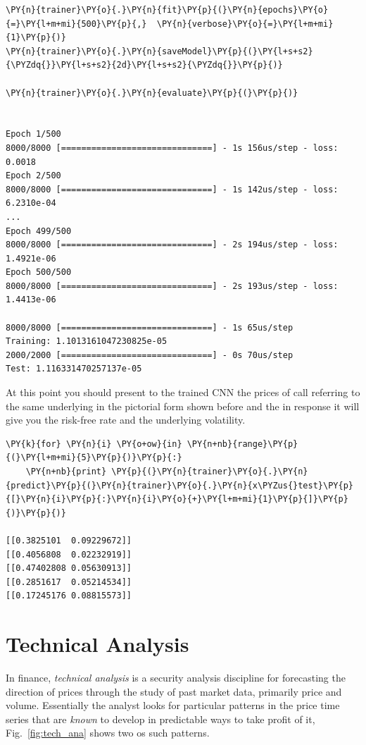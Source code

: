 \begin{codebox}[breakable, size=fbox, boxrule=1pt, pad at break*=1mm,colback=cellbackground, colframe=cellborder]
\begin{Verbatim}[commandchars=\\\{\}]
\PY{n}{trainer}\PY{o}{.}\PY{n}{fit}\PY{p}{(}\PY{n}{epochs}\PY{o}{=}\PY{l+m+mi}{500}\PY{p}{,}  \PY{n}{verbose}\PY{o}{=}\PY{l+m+mi}{1}\PY{p}{)}
\PY{n}{trainer}\PY{o}{.}\PY{n}{saveModel}\PY{p}{(}\PY{l+s+s2}{\PYZdq{}}\PY{l+s+s2}{2d}\PY{l+s+s2}{\PYZdq{}}\PY{p}{)}
	
\PY{n}{trainer}\PY{o}{.}\PY{n}{evaluate}\PY{p}{(}\PY{p}{)}


Epoch 1/500
8000/8000 [==============================] - 1s 156us/step - loss: 0.0018
Epoch 2/500
8000/8000 [==============================] - 1s 142us/step - loss: 6.2310e-04
...
Epoch 499/500
8000/8000 [==============================] - 2s 194us/step - loss: 1.4921e-06
Epoch 500/500
8000/8000 [==============================] - 2s 193us/step - loss: 1.4413e-06

8000/8000 [==============================] - 1s 65us/step
Training: 1.1013161047230825e-05
2000/2000 [==============================] - 0s 70us/step
Test: 1.116331470257137e-05
\end{Verbatim}
\end{codebox}

At this point you should present to the trained CNN the prices of call
referring to the same underlying in the pictorial form shown before and
the in response it will give you the risk-free rate and the underlying
volatility.

\begin{codebox}[breakable, size=fbox, boxrule=1pt, pad at break*=1mm,colback=cellbackground, colframe=cellborder]
\begin{Verbatim}[commandchars=\\\{\}]
\PY{k}{for} \PY{n}{i} \PY{o+ow}{in} \PY{n+nb}{range}\PY{p}{(}\PY{l+m+mi}{5}\PY{p}{)}\PY{p}{:}
    \PY{n+nb}{print} \PY{p}{(}\PY{n}{trainer}\PY{o}{.}\PY{n}{predict}\PY{p}{(}\PY{n}{trainer}\PY{o}{.}\PY{n}{x\PYZus{}test}\PY{p}{[}\PY{n}{i}\PY{p}{:}\PY{n}{i}\PY{o}{+}\PY{l+m+mi}{1}\PY{p}{]}\PY{p}{)}\PY{p}{)}

[[0.3825101  0.09229672]]
[[0.4056808  0.02232919]]
[[0.47402808 0.05630913]]
[[0.2851617  0.05214534]]
[[0.17245176 0.08815573]]
\end{Verbatim}
\end{codebox}

\section{Technical Analysis}\label{technical-analysis}

In finance, \emph{technical analysis} is a security analysis discipline
for forecasting the direction of prices through the study of past market
data, primarily price and volume. Essentially the analyst looks for
particular patterns in the price time series that are \emph{known} to
develop in predictable ways to take profit of it, Fig.~\ref{fig:tech_ana} shows two
os such patterns.

